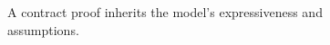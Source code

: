 \begin{figure}[H]
\centering
{}
\caption{A contract proof inherits the model's expressiveness and assumptions.}\label{fig:teach-M04-07}
\end{figure}
